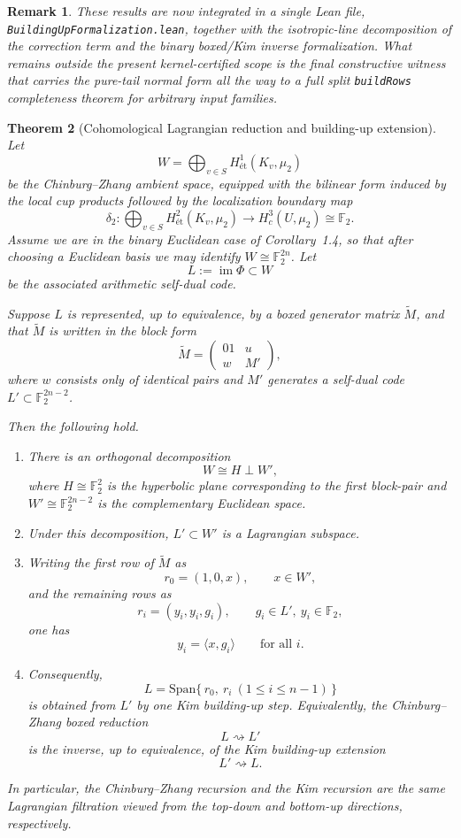 \documentclass[12pt]{article}
\newtheorem{theorem}{Theorem}[section]
\newtheorem{remark}[theorem]{Remark}
\newcommand{\Span}{\mathrm{Span}}
\newcommand{\et}{\mathrm{ét}}
\begin{document}
\begin{remark}
These results are now integrated in a single Lean file, \texttt{BuildingUpFormalization.lean}, together with the isotropic-line decomposition of the correction term and the binary boxed/Kim inverse formalization. What remains outside the present kernel-certified scope is the final constructive witness that carries the pure-tail normal form all the way to a full split \texttt{buildRows} completeness theorem for arbitrary input families.
\end{remark}

\begin{theorem}[Cohomological Lagrangian reduction and building-up extension]
\label{thm:CZ_Kim_Lagrangian}
Let
\[
W=\bigoplus_{v\in S} H^1_{\et}(K_v,\mu_2)
\]
be the Chinburg--Zhang ambient space, equipped with the bilinear form induced by the
local cup products followed by the localization boundary map
\[
\delta_2:\bigoplus_{v\in S} H^2_{\et}(K_v,\mu_2)\longrightarrow H^3_c(U,\mu_2)\cong \mathbb F_2.
\]
Assume we are in the binary Euclidean case of Corollary~1.4, so that after choosing a Euclidean basis
we may identify \(W\cong \mathbb F_2^{2n}\). Let
\[
L:=\operatorname{im}\Phi \subset W
\]
be the associated arithmetic self-dual code.

Suppose \(L\) is represented, up to equivalence, by a boxed generator matrix \(\widetilde M\), and that
\(\widetilde M\) is written in the block form
\[
\widetilde M=
\begin{pmatrix}
01 & u\\
w & M'
\end{pmatrix},
\]
where \(w\) consists only of identical pairs and \(M'\) generates a self-dual code
\(L' \subset \mathbb F_2^{2n-2}\).

Then the following hold.

\begin{enumerate}
\item There is an orthogonal decomposition
\[
W \cong H \perp W',
\]
where \(H\cong \mathbb F_2^2\) is the hyperbolic plane corresponding to the first block-pair
and \(W'\cong \mathbb F_2^{2n-2}\) is the complementary Euclidean space.

\item Under this decomposition, \(L'\subset W'\) is a Lagrangian subspace.

\item Writing the first row of \(\widetilde M\) as
\[
r_0=(1,0,x), \qquad x\in W',
\]
and the remaining rows as
\[
r_i=(y_i,y_i,g_i), \qquad g_i\in L',\ y_i\in \mathbb F_2,
\]
one has
\[
y_i=\langle x,g_i\rangle
\qquad \text{for all }i.
\]

\item Consequently,
\[
L=\Span\{\,r_0,\ r_i\ (1\le i\le n-1)\,\}
\]
is obtained from \(L'\) by one Kim building-up step. Equivalently, the Chinburg--Zhang boxed reduction
\[
L \rightsquigarrow L'
\]
is the inverse, up to equivalence, of the Kim building-up extension
\[
L' \rightsquigarrow L.
\]
\end{enumerate}

In particular, the Chinburg--Zhang recursion and the Kim recursion are the same
Lagrangian filtration viewed from the top-down and bottom-up directions, respectively.
\end{theorem}
\end{document}
